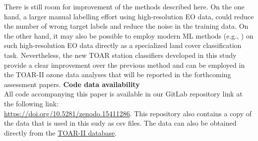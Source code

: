 \documentclass[gmd, manuscript]{copernicus}
\providecommand{\DIFaddtex}[1]{{\protect\color{blue}\uwave{#1}}} %
\providecommand{\DIFaddbegin}{} %
\providecommand{\DIFaddend}{} %
\providecommand{\DIFadd}[1]{\texorpdfstring{\DIFaddtex{#1}}{#1}} %
\newcommand{\DIFaddincludegraphics}[2][]{{\color{blue}\fbox{\DIFOincludegraphics[#1]{#2}}}} %
\DeclareRobustCommand{\DIFaddbegin}{\DIFOaddbegin \let\includegraphics\DIFaddincludegraphics} %
\DeclareRobustCommand{\DIFaddend}{\DIFOaddend \let\includegraphics\DIFOincludegraphics} %
\begin{document}
There is still room for improvement of the methods described here. On the one hand, a larger manual labelling effort using high-resolution EO data, could reduce the number of wrong target labels and reduce the noise in the training data. On the other hand, it may also be possible to employ modern ML methods \DIFaddbegin \DIFadd{with spatial context }\DIFaddend (e.g., \citep{szwarcman2024prithvi}) on such high-resolution EO data directly as a specialized land cover classification task. Nevertheless, the new TOAR station classifiers developed in this study provide a clear improvement over the previous method and can be employed in the TOAR-II ozone data analyses that will be reported in the forthcoming assessment papers.
\newpage
\textbf{Code data availability }\\All code accompanying this paper is available in our GitLab repository  link\citep{Mache2025TOARClassifier} at the following link: \\
\href{https://doi.org/10.5281/zenodo.15411286}{https://doi.org/10.5281/zenodo.15411286}. 
This repository also contains a copy of the data that is used in this sudy as csv files. The data can also be obtained directly from the  \href{https://toar-data.fz-juelich.de/api/v2}{TOAR-II database}. %






\end{document}
